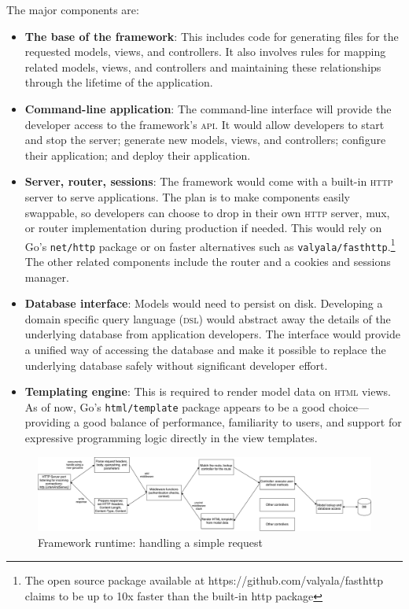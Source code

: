 \documentclass{article}
\begin{document}
The major components are:

\begin{itemize}
    \item \textbf{The base of the framework}: This includes code for generating files for the requested models, views, and controllers. It also involves rules for mapping related models, views, and controllers and maintaining these relationships through the lifetime of the application.
    \item \textbf{Command-line application}: The command-line interface will provide the developer access to the framework's \textsc{api}. It would allow developers to start and stop the server; generate new models, views, and controllers; configure their application; and deploy their application.
    \item \textbf{Server, router, sessions}: The framework would come with a built-in \textsc{http} server to serve applications. The plan is to make components easily swappable, so developers can choose to drop in their own \textsc{http} server, mux, or router implementation during production if needed. This would rely on Go's \texttt{net/http} package or on faster alternatives such as \texttt{valyala/fasthttp}.\footnote{The open source package available at {https://github.com/valyala/fasthttp} claims to be up to 10x faster than the built-in http package} The other related components include the router and a cookies and sessions manager. 
    \item \textbf{Database interface}: Models would need to persist on disk. Developing a domain specific query language (\textsc{dsl}) would abstract away the details of the underlying database from application developers. The interface would provide a unified way of accessing the database and make it possible to replace the underlying database safely without significant developer effort.
    \item \textbf{Templating engine}: This is required to render model data on \textsc{html} views. As of now, Go's \texttt{html/template} package appears to be a good choice---providing a good balance of performance, familiarity to users, and support for expressive programming logic directly in the view templates.
\end{itemize}

\begin{figure}[h]
\centering
\includegraphics[width=1.1\textwidth]{mvc-run.pdf}
\caption{Framework runtime: handling a simple request}
\end{figure}
\end{document}
